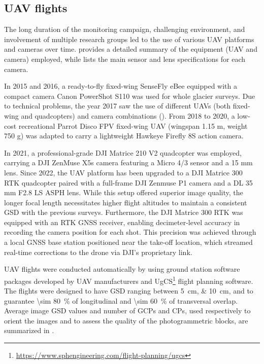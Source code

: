 \subsection{UAV flights}\label{sec:3:uav-flights}

The long duration of the monitoring campaign, challenging environment, and involvement of 
multiple research groups led to the use of various UAV platforms and cameras over time. 
 provides a detailed summary of the equipment (UAV and camera) employed, while 
 lists the main sensor and lens specifications for each camera.

In 2015 and 2016, a ready-to-fly fixed-wing SenseFly eBee equipped with a compact camera Canon
PowerShot S110 was used for whole glacier surveys.
Due to technical problems, the year 2017 saw the use of different UAVs (both fixed-wing and quadcopters)
and camera combinations (). 
From 2018 to 2020, a low-cost recreational Parrot Disco FPV fixed-wing UAV (wingspan 1.15 m, weight 750 g) 
was adapted to carry a lightweight Hawkeye Firefly 8S action camera.

In 2021, a professional-grade DJI Matrice 210 V2 quadcopter was employed, carrying a 
DJI ZenMuse X5s camera featuring a Micro 4/3 sensor and a 15 mm lens. 
Since 2022, the UAV platform has been upgraded to a DJI Matrice 300 RTK quadcopter
paired with a full-frame DJI Zenmuse P1 camera and a DL 35 mm F2.8 LS ASPH lens.
While this setup offered superior image quality, the longer focal length necessitates 
higher flight altitudes to maintain a consistent GSD with the previous surveys.
Furthermore, the DJI Matrice 300 RTK was equipped with an RTK GNSS receiver, enabling 
decimeter-level accuracy in recording the camera position for each shot. 
This precision was achieved through a local GNSS base station positioned near the take-off 
location, which streamed real-time corrections to the drone via DJI's proprietary link.

UAV flights were conducted automatically by using ground station software packages
developed by UAV manufacturers and UgCS\footnote{\url{https://www.sphengineering.com/flight-planning/ugcs}}
flight planning software.
The flights were designed to have GSD ranging between \qtylist{5;10}{\centi\meter}, and
to guarantee \qty{\sim 80}{\percent} of longitudinal and \qty{\sim 60}{\percent} of
transversal overlap.
Average image GSD values and number of GCPs and CPs, used respectively to orient the
images and to assess the quality of the photogrammetric blocks, are summarized in
.

